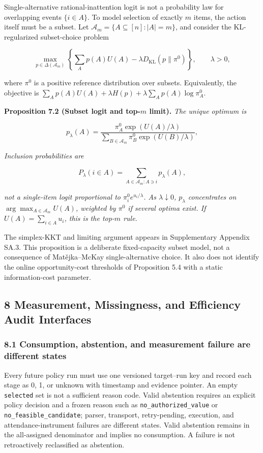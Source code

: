 \documentclass[
  11pt]{article}
\begin{document}
Single-alternative rational-inattention logit is not a probability law
for overlapping events \(\{i\in A\}\). To model selection of exactly
\(m\) items, the action itself must be a subset. Let
\(\mathcal A_m=\{A\subseteq[n]:|A|=m\}\), and consider the
KL-regularized subset-choice problem

\[\max_{p\in\Delta(\mathcal A_m)}\left\{\sum_A p(A)U(A)-\lambda D_{\mathrm{KL}}(p\|\pi^0)\right\},\qquad \lambda>0,\]

where \(\pi^0\) is a positive reference distribution over subsets.
Equivalently, the objective is
\(\sum_Ap(A)U(A)+\lambda H(p)+\lambda\sum_Ap(A)\log\pi_A^0\).

\textbf{Proposition 7.2 (Subset logit and top-\(m\) limit).} \emph{The
unique optimum is}

\[p_\lambda(A)=\frac{\pi^0_A\exp(U(A)/\lambda)}{\sum_{B\in\mathcal A_m}\pi^0_B\exp(U(B)/\lambda)},\tag{11}\]

\emph{Inclusion probabilities are}

\[P_\lambda(i\in A)=\sum_{A\in\mathcal A_m:A\ni i}p_\lambda(A),\]

\emph{not a single-item logit proportional to
\(\pi_i^0e^{u_i/\lambda}\). As \(\lambda\downarrow0\), \(p_\lambda\)
concentrates on \(\arg\max_{A\in\mathcal A_m}U(A)\), weighted by
\(\pi^0\) if several optima exist. If \(U(A)=\sum_{i\in A}u_i\), this is
the top-\(m\) rule.}

The simplex-KKT and limiting argument appears in Supplementary Appendix
SA.3. This proposition is a deliberate fixed-capacity subset model, not
a consequence of Matějka--McKay single-alternative choice. It also does
not identify the online opportunity-cost thresholds of Proposition 5.4
with a static information-cost parameter.

\subsection{8 Measurement, Missingness, and Efficiency Audit
Interfaces}\label{measurement-missingness-and-efficiency-audit-interfaces}

\subsubsection{8.1 Consumption, abstention, and measurement failure are
different
states}\label{consumption-abstention-and-measurement-failure-are-different-states}

Every future policy run must use one versioned target--run key and
record each stage as 0, 1, or unknown with timestamp and evidence
pointer. An empty \texttt{selected} set is not a sufficient reason code.
Valid abstention requires an explicit policy decision and a frozen
reason such as \texttt{no\_authorized\_value} or
\texttt{no\_feasible\_candidate}; parser, transport, retry-pending,
execution, and attendance-instrument failures are different states.
Valid abstention remains in the all-assigned denominator and implies no
consumption. A failure is not retroactively reclassified as abstention.
\end{document}
